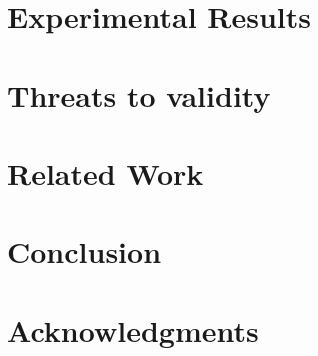 \documentclass[10pt,conference]{IEEEtran}
\begin{document}
\section{Experimental Results}
\label{sec:exp_results}


\section{Threats to validity}
\label{sec:threats}


\section{Related Work}
\label{sec:relatedwork}


\section{Conclusion}
\label{sec:conclusion}


\section{Acknowledgments}
\label{sec:acknowledgments}



 
\end{document}
